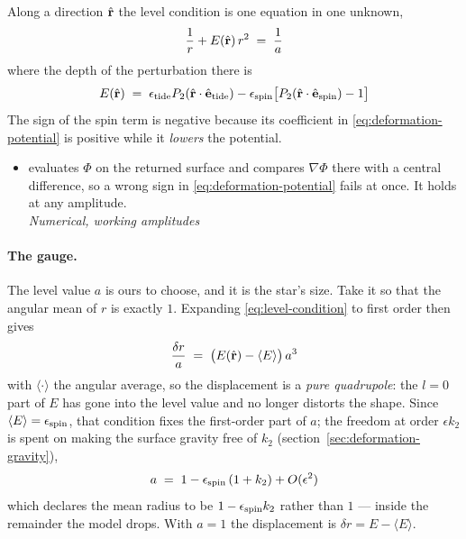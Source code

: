 Along a direction $\hat{\mathbf r}$ the level condition is one equation in one unknown,
\begin{equation}
  \frac{1}{r} + E(\hat{\mathbf r})\, r^2 \;=\; \frac{1}{a}
  \label{eq:level-condition}
\end{equation}
where the depth of the perturbation there is
\begin{equation}
  E(\hat{\mathbf r}) \;=\; \epsilon_\text{tide} P_2(\hat{\mathbf r}\cdot\hat{\mathbf e}_\text{tide})
           - \epsilon_\text{spin}\bigl[P_2(\hat{\mathbf r}\cdot\hat{\mathbf e}_\text{spin}) - 1\bigr]
  \label{eq:level-depth}
\end{equation}
The sign of the spin term is negative because its coefficient in
\eqref{eq:deformation-potential} is positive while it \emph{lowers} the potential.

\begin{itemize}
  \item[$\checkmark$]  evaluates $\Phi$ on the returned surface and
    compares $\nabla\Phi$ there with a central difference, so a wrong sign in
    \eqref{eq:deformation-potential} fails at once.  It holds at any amplitude.
    \\[1pt] \quad \emph{Numerical, working amplitudes}
\end{itemize}

\paragraph{The gauge.}  The level value $a$ is ours to choose, and it is the star's size.  Take
it so that the angular mean of $r$ is exactly $1$.  Expanding \eqref{eq:level-condition} to first
order then gives
\begin{equation}
  \frac{\delta r}{a} \;=\; \bigl(E(\hat{\mathbf r}) - \langle E\rangle\bigr)\,a^{3}
  \label{eq:gauge-displacement}
\end{equation}
with $\langle\cdot\rangle$ the angular average, so the displacement is a \emph{pure quadrupole}:
the $l = 0$ part of $E$ has gone into the level value and no longer distorts the shape.  Since
$\langle E\rangle = \epsilon_\text{spin}$, that condition fixes the first-order part of $a$; the
freedom at order $\epsilon k_2$ is spent on making the surface gravity free of $k_2$
(section~\ref{sec:deformation-gravity}),
\begin{equation}
  a \;=\; 1 - \epsilon_\text{spin}\,(1 + k_2) + O(\epsilon^{2})
  \label{eq:gauge-radius}
\end{equation}
which declares the mean radius to be $1 - \epsilon_\text{spin}{}k_2$ rather than $1$ --- inside the
remainder the model drops.  With $a = 1$ the displacement is $\delta r = E - \langle E\rangle$.

